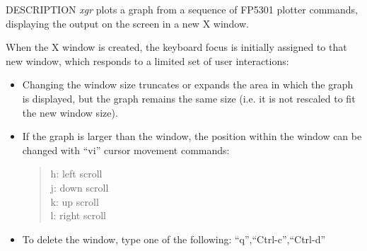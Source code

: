 \begin{synopsis}
 \item[xgr]   [ --s {\em S} ] [ --l ] [ --rv ] [ --m ] [ --bg {\em BG} ]
              [ --hl {\em HL} ] [ --bd {\em BD} ] 
 \item[\ ~~~~] [ --ms {\em MS} ] [ --g {\em G} ] [ --d {\em D} ]
              [ --t {\em T} ] [ {\em infile} ]
\end{synopsis} 

\begin{qsection}{DESCRIPTION}
{\em xgr} plots a graph from a sequence of FP5301 plotter commands, 
displaying the output on the screen in a new X window.

When the X window is created, 
the keyboard focus is initially assigned to that new window, 
which responds to a limited set of user interactions:
\begin{itemize}
\item Changing the window size truncates or expands the area 
	in which the graph is displayed, 
	but the graph remains the same size (i.e.
	it is not rescaled to fit the new window size).
\item If the graph is larger than the window, 
	the position within the window can be changed with 
	``vi'' cursor movement commands:
\begin{quote}
		h: left scroll\\
		j: down scroll\\
		k: up scroll\\
		l: right scroll
\end{quote}
\item To delete the window, type one of the following:
	``q'',``Ctrl-c'',``Ctrl-d''
\end{itemize}
\end{qsection}

